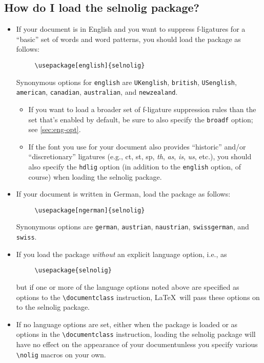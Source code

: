 \documentclass[12pt]{article}
\newcommand{\pkg}[1]{\textsf{#1}}
\newcommand{\opt}[1]{\texttt{#1}}
\newcommand{\cmmd}[1]{\texttt{\textbackslash #1}}
\begin{document}
\subsection[How do I load the selnolig package?]{How do I load the \pkg{selnolig} package?}

\begin{itemize}
\item If your document is in English and you want to suppress f-ligatures for a \enquote{basic} set of words and word patterns, you should load the package as follows:
\begin{Verbatim}
     \usepackage[english]{selnolig}
\end{Verbatim}
Synonymous options for \opt{english} are \opt{UKenglish}, \opt{british}, \opt{USenglish}, \opt{american}, \opt{cana\-dian}, \opt{australian}, and \opt{new\-zealand}.

\begin{itemize}
\item If you want to load a broader set of f-ligature suppression rules than the set that's enabled by default, be sure to also specify the \opt{broadf} option; see  \cref{sec:eng-opt}.

\item If the font you use for your document also provides \enquote{historic} and/or \enquote{discretionary} ligatures (e.g., ct, st, sp, \emph{th}, \emph{as}, \emph{is}, \emph{us}, etc.), you should also specify the \opt{hdlig} option (in addition to the \opt{english} option, of course) when loading the \pkg{selnolig} package.
\end{itemize}
\item If your document is written in German, load the package as follows:
\begin{Verbatim}
     \usepackage[ngerman]{selnolig}
\end{Verbatim}
Synonymous options are \opt{german}, \opt{austrian}, \opt{naustrian},  \opt{swissgerman}, and \opt{swiss}.

\item If you load the package \emph{without} an explicit language option, i.e., as
\begin{Verbatim}
     \usepackage{selnolig}
\end{Verbatim}
but if one or more of the language options noted above are specified as options to the \cmmd{documentclass} instruction, \LaTeX\ will pass these options on to the \pkg{selnolig} package.

\item If no language options are set, either when the package is loaded or as options in the \cmmd{documentclass} instruction, loading the \pkg{selnolig} package will have no effect on the appearance of your document\textemdash unless you specify various \cmmd{nolig} macros on your own.
\end{itemize}
\end{document}
